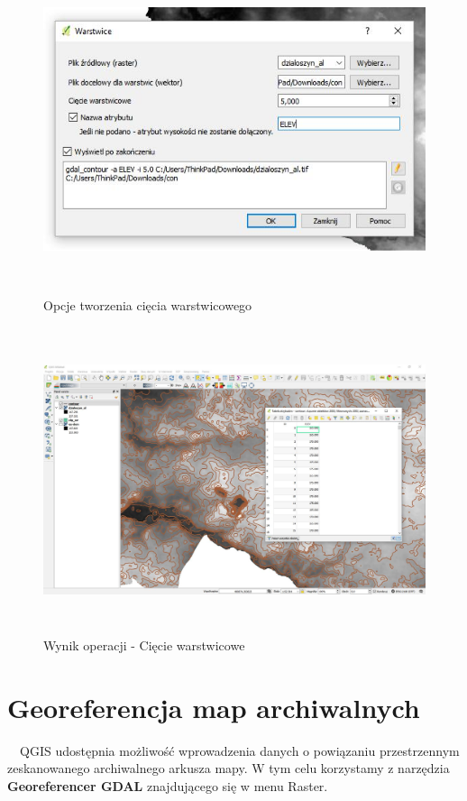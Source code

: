 \documentclass[12pt,a4paper]{book}
\begin{document}
\begin{center}
\begin{figure}
\includegraphics[width=15.004cm,height=9.578cm]{004-warstwice-opcje.jpg}
\caption{Opcje tworzenia cięcia warstwicowego}
\end{figure}
\end{center}


\begin{center}
\begin{figure}
\includegraphics[width=14.997cm,height=8.971cm]{004-warstwice-wynik.jpg}
\caption{Wynik operacji - Cięcie warstwicowe}
\end{figure}
\end{center}
\section{Georeferencja map archiwalnych}
\ \ QGIS udostępnia możliwość wprowadzenia danych o powiązaniu przestrzennym zeskanowanego archiwalnego arkusza mapy. W tym celu korzystamy z narzędzia \textbf{Georeferencer GDAL }znajdującego się w menu\textbf{ }Raster.
\end{document}
